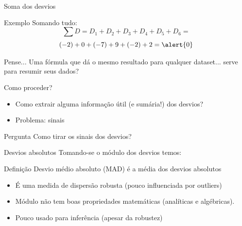 \documentclass{beamer}
\begin{document}
\begin{frame}{\scriptsize Soma dos desvios}
  \begin{exampleblock}{Exemplo}
    \footnotesize
    Somando tudo:
    \begin{displaymath}
    \sum D = D_1 + D_2 + D_3 + D_4 + D_5 + D_6 =
  \end{displaymath}
  \begin{displaymath}
    (-2) + 0 + (-7) + 9 + (-2) + 2 = \alert{0}
  \end{displaymath}
  \end{exampleblock}
  \bigskip
  \vfill
  \begin{block}{Pense...}
    \footnotesize
    Uma fórmula que dá o mesmo resultado para qualquer dataset... serve para resumir seus dados?
  \end{block}
\end{frame}

\begin{frame}{\scriptsize Como proceder?}
  \begin{itemize}
    \footnotesize
  \item Como extrair alguma informação útil (e sumária!) dos desvios?
  \item Problema: sinais
  \end{itemize}
  \bigskip
  \vfill
  \begin{block}{Pergunta}
    \footnotesize
    Como tirar os sinais dos desvios?
  \end{block}
\end{frame}

\begin{frame}{\scriptsize Desvios absolutos}
  \scriptsize
  Tomando-se o módulo dos desvios temos:

  \bigskip
  \begin{block}{Definição}
    \footnotesize
    Desvio médio absoluto (MAD) é a média dos desvios absolutos
  \end{block}

  \bigskip
  \begin{itemize}
    \scriptsize
  \item É uma medida de dispersão robusta (pouco influenciada por
    outliers)
    \medskip
  \item Módulo não tem boas propriedades matemáticas (analíticas e
    algébricas).
    \medskip
  \item Pouco usado para inferência (apesar da robustez)
  \end{itemize}
\end{frame}
\end{document}
